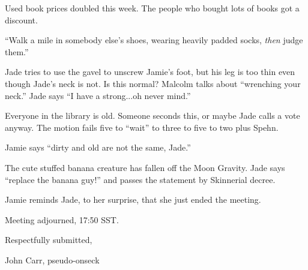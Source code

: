 \documentclass[12pt]{article}
\begin{document}
Used book prices doubled this week.  The people who bought lots of
books got a discount.

``Walk a mile in somebody else's shoes, wearing heavily padded
socks, {\em then} judge them.''

Jade tries to use the gavel to unscrew Jamie's foot, but his leg is
too thin even though Jade's neck is not.  Is this normal?  Malcolm
talks about ``wrenching your neck.''  Jade says ``I have a strong...oh
never mind.''

Everyone in the library is old.  Someone seconds this, or maybe Jade
calls a vote anyway.  The motion fails five to ``wait'' to three to
five to two plus Spehn.

Jamie says ``dirty and old are not the same, Jade.''

The cute stuffed banana creature has fallen off the Moon Gravity.
Jade says ``replace the banana guy!'' and passes the statement by
Skinnerial decree.

Jamie reminds Jade, to her surprise, that she just ended the meeting.

\vspace{12pt}

\noindent
Meeting adjourned, 17:50 SST.

\vspace{18pt}

\centerline{Respectfully submitted,}
\centerline{John Carr, pseudo-onseck}
\end{document}
